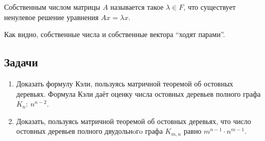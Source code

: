 \begin{definition}
Собственным числом матрицы $A$ называется такое $\lambda \in F$, что существует ненулевое решение уравнения $Ax = \lambda x$.
\end{definition}

Как видно, собственные числа и собственные вектора ``ходят парами''.

\subsection{Задачи}
\begin{enumerate}
\item Доказать формулу Кэли, пользуясь матричной теоремой об остовных деревьях. Формула Кэли даёт оценку числа остовных деревьев полного графа $K_{n}$: $n^{n-2}$.
\item Доказать, пользуясь матричной теоремой об остовных деревьях, что число остовных деревьев полного двудольнoгo графа $K_{m,n}$ равно $m^{n-1}\cdot n^{m-1}$.
\end{enumerate}